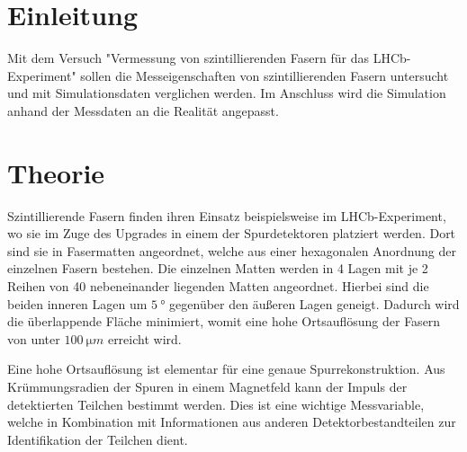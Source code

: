 \section{Einleitung}
Mit dem Versuch "Vermessung von szintillierenden Fasern für das LHCb-Experiment" sollen die Messeigenschaften von szintillierenden Fasern untersucht und mit Simulationsdaten verglichen werden. Im Anschluss wird die Simulation anhand der Messdaten an die Realität angepasst.

\section{Theorie}
Szintillierende Fasern finden ihren Einsatz beispielsweise im LHCb-Experiment, wo sie im Zuge des Upgrades in einem der Spurdetektoren platziert werden.
Dort sind sie in Fasermatten angeordnet, welche aus einer hexagonalen Anordnung der einzelnen Fasern bestehen. Die einzelnen Matten werden in 4 Lagen mit je 2 Reihen von 40 nebeneinander liegenden Matten angeordnet. Hierbei sind die beiden inneren Lagen um $\SI{5}{°}$ gegenüber den äußeren Lagen geneigt. Dadurch wird die überlappende Fläche minimiert, womit eine hohe Ortsauflösung der Fasern von unter $\SI{100}{\micro m}$ erreicht wird.

Eine hohe Ortsauflösung ist elementar für eine genaue Spurrekonstruktion. Aus Krümmungsradien der Spuren in einem Magnetfeld kann der Impuls der detektierten Teilchen bestimmt werden. Dies ist eine wichtige Messvariable, welche in Kombination mit Informationen aus anderen Detektorbestandteilen zur Identifikation der Teilchen dient.

